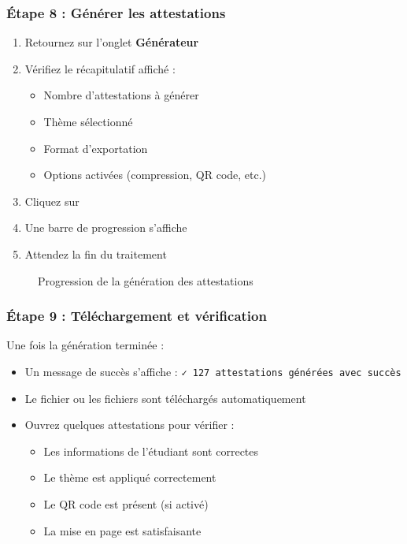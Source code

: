 \subsubsection{Étape 8 : Générer les attestations}

\begin{enumerate}[leftmargin=*]
    \item Retournez sur l'onglet \textbf{Générateur}
    \item Vérifiez le récapitulatif affiché :
    \begin{itemize}
        \item Nombre d'attestations à générer
        \item Thème sélectionné
        \item Format d'exportation
        \item Options activées (compression, QR code, etc.)
    \end{itemize}
    \item Cliquez sur 
    \item Une barre de progression s'affiche
    \item Attendez la fin du traitement
\end{enumerate}

\begin{figure}[h]
    \centering
    \caption{Progression de la génération des attestations}
\end{figure}

\subsubsection{Étape 9 : Téléchargement et vérification}

Une fois la génération terminée :

\begin{itemize}[leftmargin=*]
    \item Un message de succès s'affiche : \texttt{✓ 127 attestations générées avec succès}
    \item Le fichier ou les fichiers sont téléchargés automatiquement
    \item Ouvrez quelques attestations pour vérifier :
    \begin{itemize}
        \item Les informations de l'étudiant sont correctes
        \item Le thème est appliqué correctement
        \item Le QR code est présent (si activé)
        \item La mise en page est satisfaisante
    \end{itemize}
\end{itemize}

